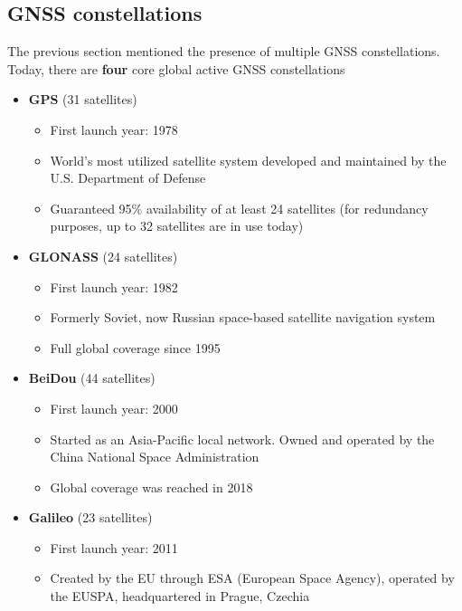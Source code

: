 \documentclass[FM,BP,EN,fonts]{tulthesis}
\begin{document}
\subsection{GNSS constellations}
\label{subsec:constellations}
The previous section mentioned the presence of multiple GNSS constellations. Today, there are \textbf{four} core global active GNSS constellations

\begin{itemize}
    \item \textbf{GPS} (31 satellites) \cite{gps}
        \begin{itemize}
            \item First launch year: 1978
            \item World's most utilized satellite system developed and maintained by the U.S. Department of Defense
            \item Guaranteed 95\% availability of at least 24 satellites (for redundancy purposes, up to 32 satellites are in use today)
        \end{itemize}
    \item \textbf{GLONASS} (24 satellites) \cite{glonass}
        \begin{itemize}
            \item First launch year: 1982
            \item Formerly Soviet, now Russian space-based satellite 
            navigation system
            \item Full global coverage since 1995
        \end{itemize}
    \item \textbf{BeiDou} (44 satellites) \cite{beidou}
        \begin{itemize}
            \item First launch year: 2000
            \item Started as an Asia-Pacific local network. Owned and operated by the China National Space Administration
            \item Global coverage was reached in 2018
        \end{itemize}
    \item \textbf{Galileo} (23 satellites) \cite{galileo}
        \begin{itemize}
            \item First launch year: 2011
            \item Created by the EU through ESA (European Space Agency), operated by the EUSPA, headquartered in Prague, Czechia
        \end{itemize}
\end{itemize}
\end{document}
